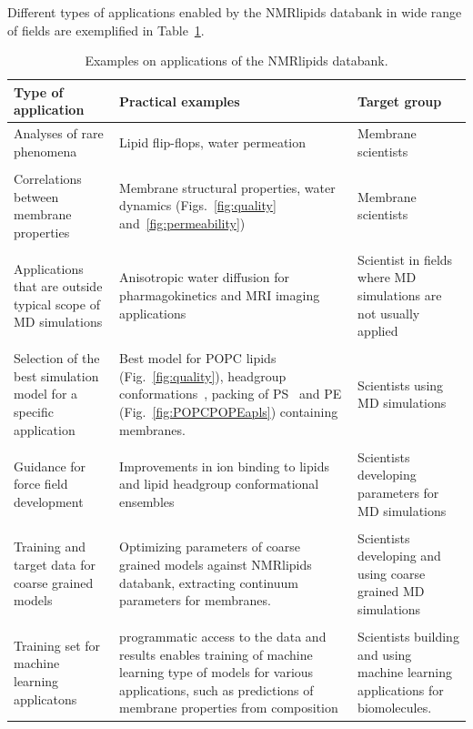 \documentclass[fleqn,10pt]{wlscirep}
\begin{document}
Different types of applications enabled by the NMRlipids databank in wide range of fields are exemplified in Table~\ref{tab:applications}. 

\begin{table}[]
    \centering
    \begin{tabular}{p{5.0cm}  p{5.0cm}  p{4.0cm}}
    Type of application     & Practical examples & Target group \\
    \hline
    Analyses of rare phenomena               & Lipid flip-flops, water permeation & Membrane scientists \\
    \\
    Correlations between membrane properties & 
    Membrane structural properties, water dynamics (Figs.~\ref{fig:quality} and~\ref{fig:permeability}) & 
    Membrane scientists \\
    \\
    Applications that are outside typical scope of MD simulations & 
    Anisotropic water diffusion for pharmagokinetics and MRI imaging applications & 
    Scientist in fields where MD simulations are not usually applied \\
    \\
    Selection of the best simulation model for a specific application & 
    Best model for POPC lipids (Fig.~\ref{fig:quality}), headgroup conformations~\cite{bacle21}, 
    packing of PS~\cite{antila22b} and PE (Fig.~\ref{fig:POPCPOPEapls}) containing membranes. &
    Scientists using MD simulations \\
    \\
    Guidance for force field development & 
    Improvements in ion binding to lipids~\cite{melcr18,melcr20} and lipid headgroup conformational ensembles~\cite{??} &
    Scientists developing parameters for MD simulations \\
    \\
    Training and target data for coarse grained models & 
    Optimizing parameters of coarse grained models against NMRlipids databank, extracting continuum parameters for membranes. &
    Scientists developing and using coarse grained MD simulations \\
    \\
    Training set for machine learning applicatons &
    programmatic access to the data and results enables training of machine learning type of models for various applications, such as predictions of membrane properties from composition & Scientists building and using machine learning applications for biomolecules.  
    \end{tabular}
    \caption{Examples on applications of the NMRlipids databank.}
    \label{tab:applications}
\end{table}
\end{document}
